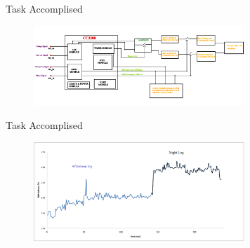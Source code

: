 \documentclass[10pt, a4paper]{beamer}
\begin{document}
\begin{frame}{Task Accomplised}
	\begin{figure}[h]
		\includegraphics[width=300px]{block}
	\end{figure}
\end{frame}

\begin{frame}{Task Accomplised}
	\begin{figure}[h]
		\includegraphics[width=300px]{datalog_volt}
	\end{figure}
\end{frame}
\end{document}
